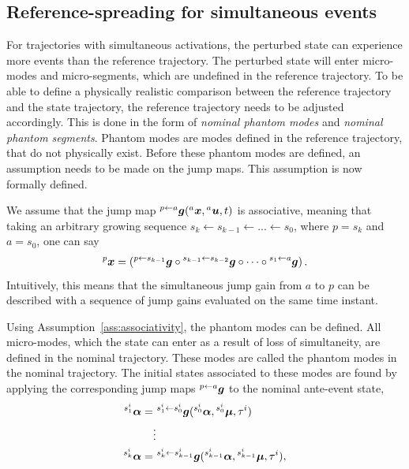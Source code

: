 \documentclass[../DC2017114Bouma.tex]{subfiles}
\begin{document}
\subsection{Reference-spreading for simultaneous events}
For trajectories with simultaneous activations, the perturbed state can experience more events than the reference trajectory. The perturbed state will enter micro-modes and micro-segments, which are undefined in the reference trajectory. To be able to define a physically realistic comparison between the reference trajectory and the state trajectory, the reference trajectory needs to be adjusted accordingly. This is done in the form of \textit{nominal phantom modes} and \textit{nominal phantom segments}. Phantom modes are modes defined in the reference trajectory, that do not physically exist. Before these phantom modes are defined, an assumption needs to be made on the jump maps. This assumption is now formally defined.
\begin{myass}\label{ass:associativity}
We assume that the jump map $\hspace{0cm}^{p\leftarrow a}{\boldsymbol{g}}(\hspace{0cm}^{a}{\boldsymbol{x}},\hspace{0cm}^{a}{\boldsymbol{u}},t)$ is associative, meaning that taking an arbitrary growing sequence $s_k\leftarrow s_{k-1} \leftarrow ... \leftarrow s_0$, where $p = s_k$ and $a = s_0$, one can say
\begin{align}
\hspace{0cm}^{p}{\boldsymbol{x}} = \left(\hspace{0cm}^{p\leftarrow s_{k-1}}{\boldsymbol{g}} \circ \hspace{0cm}^{s_{k-1} \leftarrow s_{k-2}}{\boldsymbol{g}} \circ \cdots \circ \hspace{0cm}^{s_1 \leftarrow a}{\boldsymbol{g}} \right).
\end{align}
Intuitively, this means that the simultaneous jump gain from $a$ to $p$ can be described with a sequence of jump gains evaluated on the same time instant.
\end{myass}
Using Assumption~\ref{ass:associativity}, the phantom modes can be defined. All micro-modes, which the state can enter as a result of loss of simultaneity, are defined in the nominal trajectory. These modes are called the phantom modes in the nominal trajectory. The initial states associated to these modes are found by applying the corresponding jump maps $\hspace{0cm}^{p\leftarrow a}{\boldsymbol{g}}$ to the nominal ante-event state,
\begin{align}
\hspace{0cm}^{s^i_1}\boldsymbol{\alpha} =&\ \hspace{0cm}^{s^i_1\leftarrow s^i_0}{\boldsymbol{g}}(\hspace{0cm}^{s^i_0}\boldsymbol{\alpha},\hspace{0cm}^{s^i_0}\boldsymbol{\mu},\tau^i)\nonumber\\
&\vdots\label{eq:4phantomini}\\
\hspace{0cm}^{s^i_{k}}\boldsymbol{\alpha} =&\ \hspace{0cm}^{s^i_k\leftarrow s^i_{k-1}}{\boldsymbol{g}}(\hspace{0cm}^{s^i_{k-1}}\boldsymbol{\alpha},\hspace{0cm}^{s^i_{k-1}}\boldsymbol{\mu},\tau^i),\nonumber
\end{align}
\end{document}
